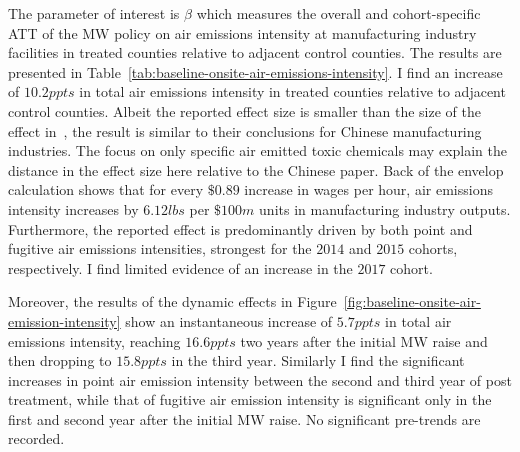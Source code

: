 \documentclass{C:/Users/david/OneDrive/Documents/ULMS/PhD/Thesis/chapter3/src/climate_change/latex/Economic_Journal/OUP-EJ}
\begin{document}
    The parameter of interest is $\beta$ which measures the overall and cohort-specific ATT of the MW policy on air emissions intensity at manufacturing industry facilities in treated counties relative to adjacent control counties. The results are presented in Table~\ref{tab:baseline-onsite-air-emissions-intensity}. I find an increase of $10.2ppts$ in total air emissions intensity in treated counties relative to adjacent control counties. Albeit the reported effect size is smaller than the size of the effect in~\citet{zhang2023unintended}, the result is similar to their conclusions for Chinese manufacturing industries. The focus on only specific air emitted toxic chemicals may explain the distance in the effect size here relative to the Chinese paper. Back of the envelop calculation shows that for every $\$0.89$ increase in wages per hour, air emissions intensity increases by $6.12lbs$ per $\$100m$ units in manufacturing industry outputs. Furthermore, the reported effect is predominantly driven by both point and fugitive air emissions intensities, strongest for the $2014$ and $2015$ cohorts, respectively. I find limited evidence of an increase in the $2017$ cohort.

    Moreover, the results of the dynamic effects in Figure~\ref{fig:baseline-onsite-air-emission-intensity} show an instantaneous increase of $5.7ppts$ in total air emissions intensity, reaching $16.6ppts$ two years after the initial MW raise and then dropping to $15.8ppts$ in the third year. Similarly I find the significant increases in point air emission intensity between the second and third year of post treatment, while that of fugitive air emission intensity is significant only in the first and second year after the initial MW raise. No significant pre-trends are recorded.
    
\end{document}
